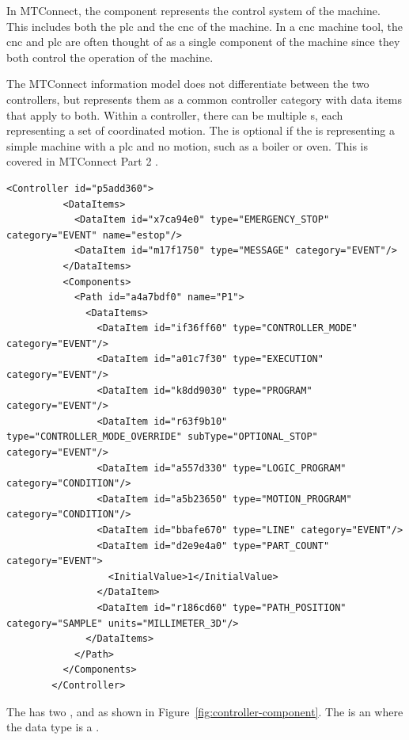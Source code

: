 In MTConnect, the  component represents the control system of the machine. This includes both the \gls{plc} and the \gls{cnc} of the machine. In a \gls{cnc} machine tool, the \gls{cnc} and \gls{plc} are often thought of as a single component of the machine since they both control the operation of the machine.

The MTConnect information model does not differentiate between the two controllers, but represents them as a common controller category with data items that apply to both. Within a controller, there can be multiple s, each representing a set of coordinated motion. The  is optional if the  is representing a simple machine with a \gls{plc} and no motion, such as a boiler or oven. This is covered in MTConnect Part 2 \cite{MTCPart2}.

\begin{lstlisting}[firstnumber=last,%
    caption={Controller and Path Components and Their Data Items},label={lst:controller-component}]
        <Controller id="p5add360">
          <DataItems>
            <DataItem id="x7ca94e0" type="EMERGENCY_STOP" category="EVENT" name="estop"/>
            <DataItem id="m17f1750" type="MESSAGE" category="EVENT"/>
          </DataItems>
          <Components>
            <Path id="a4a7bdf0" name="P1">
              <DataItems>
                <DataItem id="if36ff60" type="CONTROLLER_MODE" category="EVENT"/>
                <DataItem id="a01c7f30" type="EXECUTION" category="EVENT"/>
                <DataItem id="k8dd9030" type="PROGRAM" category="EVENT"/>
                <DataItem id="r63f9b10" type="CONTROLLER_MODE_OVERRIDE" subType="OPTIONAL_STOP" category="EVENT"/>
                <DataItem id="a557d330" type="LOGIC_PROGRAM" category="CONDITION"/>
                <DataItem id="a5b23650" type="MOTION_PROGRAM" category="CONDITION"/>
                <DataItem id="bbafe670" type="LINE" category="EVENT"/>
                <DataItem id="d2e9e4a0" type="PART_COUNT" category="EVENT">
                  <InitialValue>1</InitialValue>
                </DataItem>
                <DataItem id="r186cd60" type="PATH_POSITION" category="SAMPLE" units="MILLIMETER_3D"/>
              </DataItems>
            </Path>
          </Components>
        </Controller>
\end{lstlisting}

The  has two ,  and  as shown in Figure~\ref{fig:controller-component}. The  is an  where the data type is a .

